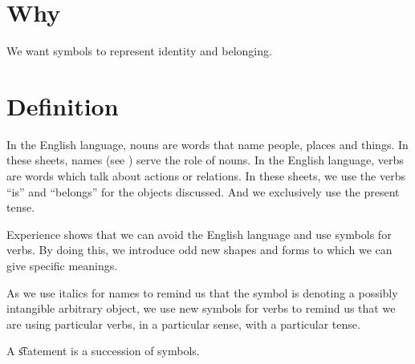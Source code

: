 
\section*{Why}

We want symbols to represent identity and belonging.


\section*{Definition}

In the English language, nouns are words that name people, places and things.
In these sheets, names (see ) serve the role of nouns.
In the English language, verbs are words which talk about actions or relations.
In these sheets, we use the verbs ``is'' and ``belongs'' for the objects discussed.
And we exclusively use the present tense.


Experience shows that we can avoid the English language and use symbols for verbs.
By doing this, we introduce odd new shapes and forms to which we can give specific meanings.
%  

As we use italics for names to remind us that the symbol is denoting a possibly intangible arbitrary object, we use new symbols for verbs to remind us that we are using particular verbs, in a particular sense, with a particular tense.
%  

A \t{statement} is a succession of symbols.

